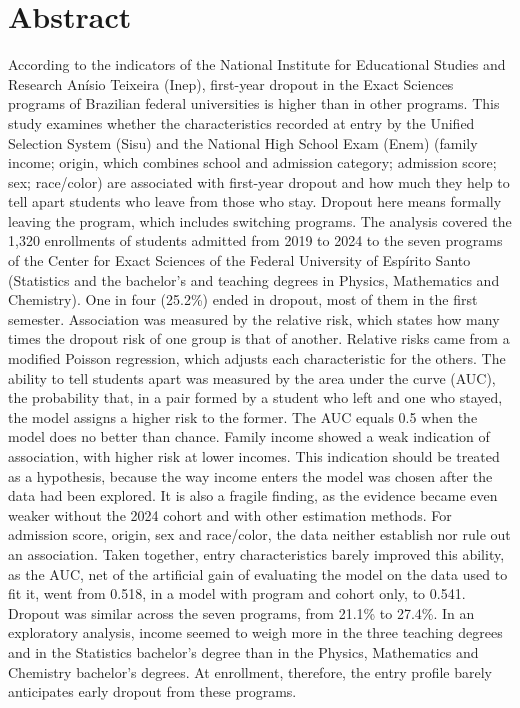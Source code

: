 \documentclass[12pt,a4paper]{article}
\begin{document}
\newpage
\section*{Abstract}

According to the indicators of the National Institute for Educational Studies and Research Anísio Teixeira (Inep), first-year dropout in the Exact Sciences programs of Brazilian federal universities is higher than in other programs. This study examines whether the characteristics recorded at entry by the Unified Selection System (Sisu) and the National High School Exam (Enem) (family income; origin, which combines school and admission category; admission score; sex; race/color) are associated with first-year dropout and how much they help to tell apart students who leave from those who stay. Dropout here means formally leaving the program, which includes switching programs. The analysis covered the 1,320 enrollments of students admitted from 2019 to 2024 to the seven programs of the Center for Exact Sciences of the Federal University of Espírito Santo (Statistics and the bachelor's and teaching degrees in Physics, Mathematics and Chemistry). One in four (25.2\%) ended in dropout, most of them in the first semester. Association was measured by the relative risk, which states how many times the dropout risk of one group is that of another. Relative risks came from a modified Poisson regression, which adjusts each characteristic for the others. The ability to tell students apart was measured by the area under the curve (AUC), the probability that, in a pair formed by a student who left and one who stayed, the model assigns a higher risk to the former. The AUC equals 0.5 when the model does no better than chance. Family income showed a weak indication of association, with higher risk at lower incomes. This indication should be treated as a hypothesis, because the way income enters the model was chosen after the data had been explored. It is also a fragile finding, as the evidence became even weaker without the 2024 cohort and with other estimation methods. For admission score, origin, sex and race/color, the data neither establish nor rule out an association. Taken together, entry characteristics barely improved this ability, as the AUC, net of the artificial gain of evaluating the model on the data used to fit it, went from 0.518, in a model with program and cohort only, to 0.541. Dropout was similar across the seven programs, from 21.1\% to 27.4\%. In an exploratory analysis, income seemed to weigh more in the three teaching degrees and in the Statistics bachelor's degree than in the Physics, Mathematics and Chemistry bachelor's degrees. At enrollment, therefore, the entry profile barely anticipates early dropout from these programs.
\end{document}
